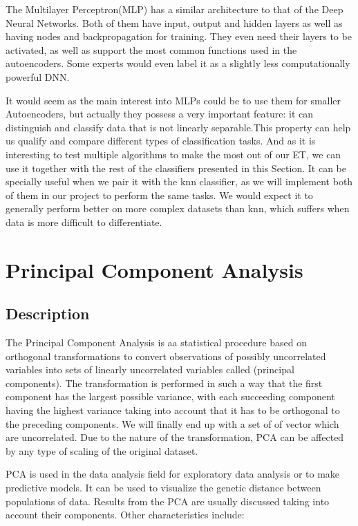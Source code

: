 The Multilayer Perceptron(MLP) has a similar architecture to that of the Deep Neural Networks. Both of them have input, output and hidden layers as well as having nodes and backpropagation for training. They even need their layers to be activated, as well as support the most common functions used in the autoencoders. Some experts would even label it as a slightly less computationally powerful DNN. \par

It would seem as the main interest into MLPs could be to use them for smaller Autoencoders, but actually they possess a very important feature: it can distinguish and classify data that is not linearly separable.This property can help us qualify and compare different types of classification tasks. And as it is interesting to test multiple algorithms to make the most out of our ET, we can use it together with the rest of the classifiers presented in this Section. It can be specially useful when we pair it with the knn classifier, as we will implement both of them in our project to perform the same tasks. We would expect it to generally perform better on more complex datasets than knn, which suffers when data is more difficult to differentiate. \par

\section{Principal Component Analysis}
\subsection{Description}
The Principal Component Analysis is aa statistical procedure based on orthogonal transformations to convert observations of possibly uncorrelated variables into sets of linearly uncorrelated variables called (principal components). The transformation is performed in such a way that the first component has the largest possible variance, with each succeeding component having the highest variance taking into account that it has to be orthogonal to the preceding components. We will finally end up with a set of of vector which are uncorrelated. Due to the nature of the transformation, PCA can be affected by any type of scaling of the original dataset. \par

PCA is used in the data analysis field for exploratory data analysis or to make predictive models. It can be used to visualize the genetic distance between populations of data. Results from the PCA are usually discussed taking into account their components. Other characteristics include:

